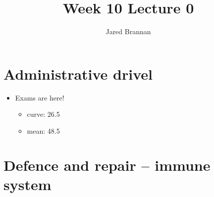 \documentclass{article}
\title{Week 10 Lecture 0}
\author{Jared Brannan }
\theoremstyle{definition}
\begin{document}
\maketitle

\section{Administrative drivel}
\begin{itemize}
	\item Exams are here!
		\begin{itemize}
			\item curve: 26.5
			\item mean: 48.5
		\end{itemize}
\end{itemize}

\section{Defence and repair -- immune system}
\end{document}
